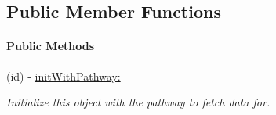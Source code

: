 \subsection*{Public Member Functions}
\begin{Indent}\paragraph*{Public Methods}
\begin{DoxyCompactItemize}
\item 
\hypertarget{interface_p_c_graph_data_fetcher_a60649e6d969732778b504f4405152b06}{
(id) -\/ \hyperlink{interface_p_c_graph_data_fetcher_a60649e6d969732778b504f4405152b06}{initWithPathway:}}
\label{interface_p_c_graph_data_fetcher_a60649e6d969732778b504f4405152b06}

\begin{DoxyCompactList}\small\item\em Initialize this object with the pathway to fetch data for. \end{DoxyCompactList}\end{DoxyCompactItemize}
\end{Indent}
